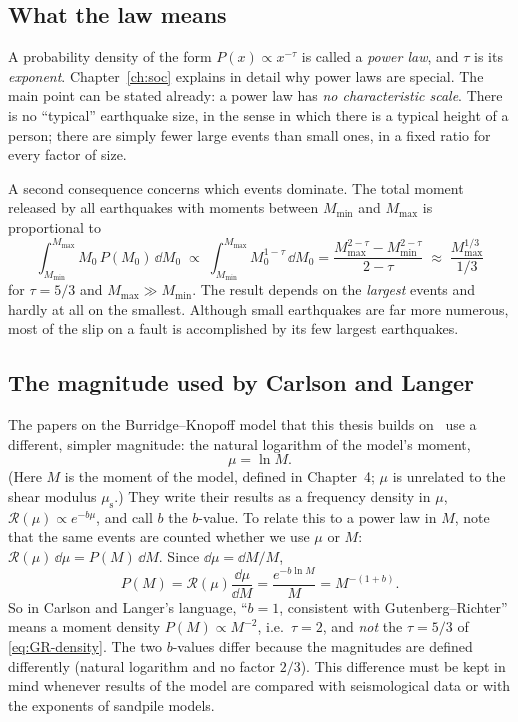 \subsection{What the law means}

A probability density of the form $P(x)\propto x^{-\tau}$ is called a \emph{power law}, and $\tau$ is
its \emph{exponent}. Chapter~\ref{ch:soc} explains in detail why power laws are special. The main
point can be stated already: a power law has \emph{no characteristic scale}. There is no
``typical'' earthquake size, in the sense in which there is a typical height of a person; there
are simply fewer large events than small ones, in a fixed ratio for every factor of size.

A second consequence concerns which events dominate. The total moment released by all earthquakes
with moments between $M_{\min}$ and $M_{\max}$ is proportional to
\begin{equation}
  \int_{M_{\min}}^{M_{\max}} M_0\, P(M_0)\, \dd M_0 \;\propto\; \int_{M_{\min}}^{M_{\max}} M_0^{1-\tau}\,\dd M_0
  = \frac{M_{\max}^{2-\tau} - M_{\min}^{2-\tau}}{2-\tau} \;\approx\; \frac{M_{\max}^{1/3}}{1/3}
\end{equation}
for $\tau = 5/3$ and $M_{\max}\gg M_{\min}$. The result depends on the \emph{largest} events and hardly
at all on the smallest. Although small earthquakes are far more numerous, most of the slip on a fault
is accomplished by its few largest earthquakes.

\subsection{The magnitude used by Carlson and Langer}

The papers on the Burridge--Knopoff model that this thesis builds on~\cite{CarlsonLanger1989,Carlson1991}
use a different, simpler magnitude: the natural logarithm of the model's moment,
\begin{equation}
  \mu = \ln M .
\end{equation}
(Here $M$ is the moment of the model, defined in Chapter~4; $\mu$ is unrelated to the shear
modulus $\mu_{\mathrm s}$.) They write their results as a frequency density in $\mu$,
$\mathcal R(\mu)\propto e^{-b\mu}$, and call $b$ the $b$-value. To relate this to a power law in $M$,
note that the same events are counted whether we use $\mu$ or $M$:
$\mathcal R(\mu)\,\dd\mu = P(M)\,\dd M$. Since $\dd\mu = \dd M/M$,
\begin{equation}
  P(M) = \mathcal R(\mu)\frac{\dd\mu}{\dd M} = \frac{e^{-b\ln M}}{M} = M^{-(1+b)} .
  \label{eq:CL-b-tau}
\end{equation}
So in Carlson and Langer's language, ``$b=1$, consistent with Gutenberg--Richter'' means a moment density
$P(M)\propto M^{-2}$, i.e.\ $\tau = 2$, and \emph{not} the $\tau=5/3$ of \cref{eq:GR-density}. The two
$b$-values differ because the magnitudes are defined differently (natural logarithm and no factor
$2/3$). This difference must be kept in mind whenever results of the model are compared with
seismological data or with the exponents of sandpile models.

